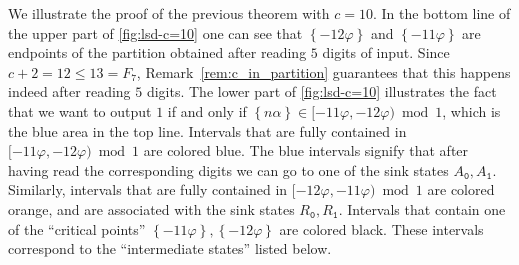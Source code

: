 \documentclass[12pt,runningheads]{llncs}
\newcommand{\tO}{\mathtt{0}}
\newcommand{\tL}{\mathtt{1}}
\renewcommand{\phi}{\varphi}
\newcommand{\fract}[1]{\left\{ #1 \right\}}
\begin{document}
\begin{example}
We illustrate the proof of the previous theorem with $c=10$. 
In the bottom line of the upper part of \cref{fig:lsd-c=10} one can see that $\fract{-12 \phi}$ and $\fract{-11\phi}$ are endpoints of the partition obtained after reading $5$ digits of input. 
Since $c+2 = 12\leq 13 = F_7$, Remark~\ref{rem:c_in_partition} guarantees that this happens indeed after reading $5$ digits.
The lower part of \cref{fig:lsd-c=10} illustrates the fact that we want to output $1$ if and only if $\fract{n\alpha}\in [-11\phi, -12\phi) \bmod 1$, which is the blue area in the top line. Intervals that are fully contained in $[-11\phi, -12\phi) \bmod 1$ are colored blue. The blue intervals signify that after having read the corresponding digits we can go to one of the sink states $A_{\tO},A_{\tL}$. Similarly, intervals that are fully contained in $[-12\phi, -11\phi) \bmod 1$ are colored orange, and are associated with the sink states $R_{\tO},R_{\tL}$. Intervals that contain one of the ``critical points'' $\fract{-11\phi}, \fract{-12\phi}$ are colored black. These intervals correspond to the ``intermediate states'' listed below.

\setlength{\belowcaptionskip}{0pt}
\begin{figure}[ht]
\centering
\scalebox{1}{
\begin{tikzpicture}


\end{tikzpicture}}
\end{figure}
\end{example}
\end{document}
